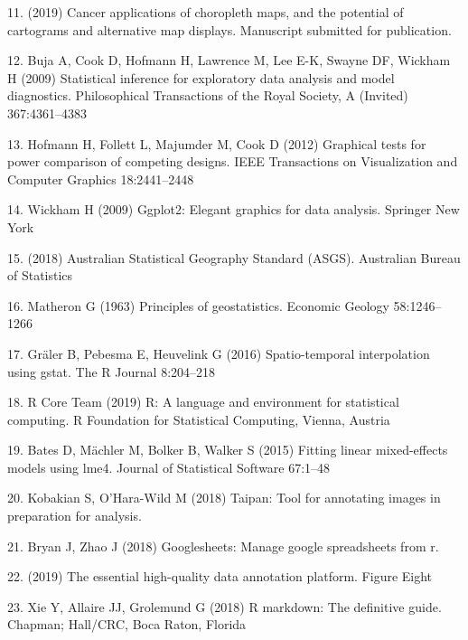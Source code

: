 \documentclass[conference,final,]{IEEEtran}
\begin{document}
\leavevmode\hypertarget{ref-review}{}%
11. (2019) Cancer applications of choropleth maps, and the potential of cartograms and alternative map displays. Manuscript submitted for publication.

\leavevmode\hypertarget{ref-BCHLLSW09}{}%
12. Buja A, Cook D, Hofmann H, Lawrence M, Lee E-K, Swayne DF, Wickham H (2009) Statistical inference for exploratory data analysis and model diagnostics. Philosophical Transactions of the Royal Society, A (Invited) 367:4361--4383

\leavevmode\hypertarget{ref-GTPCCD}{}%
13. Hofmann H, Follett L, Majumder M, Cook D (2012) Graphical tests for power comparison of competing designs. IEEE Transactions on Visualization and Computer Graphics 18:2441--2448

\leavevmode\hypertarget{ref-ggplot2}{}%
14. Wickham H (2009) Ggplot2: Elegant graphics for data analysis. Springer New York

\leavevmode\hypertarget{ref-abs2016}{}%
15. (2018) Australian Statistical Geography Standard (ASGS). Australian Bureau of Statistics

\leavevmode\hypertarget{ref-POG}{}%
16. Matheron G (1963) Principles of geostatistics. Economic Geology 58:1246--1266

\leavevmode\hypertarget{ref-gstat}{}%
17. Gräler B, Pebesma E, Heuvelink G (2016) Spatio-temporal interpolation using gstat. The R Journal 8:204--218

\leavevmode\hypertarget{ref-RCore}{}%
18. R Core Team (2019) R: A language and environment for statistical computing. R Foundation for Statistical Computing, Vienna, Austria

\leavevmode\hypertarget{ref-lme4}{}%
19. Bates D, Mächler M, Bolker B, Walker S (2015) Fitting linear mixed-effects models using lme4. Journal of Statistical Software 67:1--48

\leavevmode\hypertarget{ref-taipan}{}%
20. Kobakian S, O'Hara-Wild M (2018) Taipan: Tool for annotating images in preparation for analysis.

\leavevmode\hypertarget{ref-sheets}{}%
21. Bryan J, Zhao J (2018) Googlesheets: Manage google spreadsheets from r.

\leavevmode\hypertarget{ref-figeight}{}%
22. (2019) The essential high-quality data annotation platform. Figure Eight

\leavevmode\hypertarget{ref-rmarkdown}{}%
23. Xie Y, Allaire JJ, Grolemund G (2018) R markdown: The definitive guide. Chapman; Hall/CRC, Boca Raton, Florida
\end{document}
